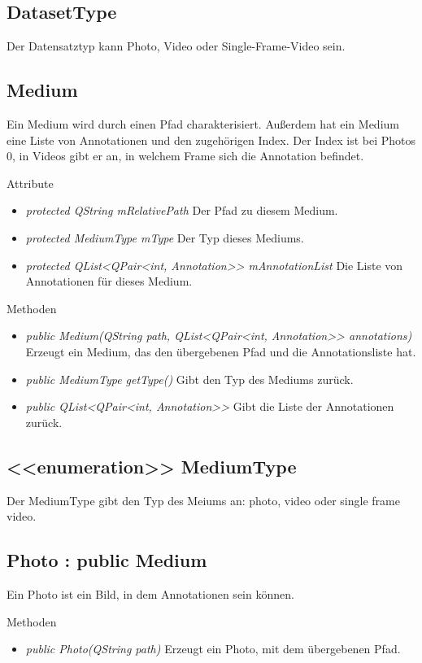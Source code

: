\subsection*{DatasetType}
Der Datensatztyp kann Photo, Video oder Single-Frame-Video sein.

\subsection*{Medium}
Ein Medium wird durch einen Pfad charakterisiert. Außerdem hat ein Medium eine Liste von Annotationen und den zugehörigen Index. Der Index ist bei Photos 0, in Videos gibt er an, in welchem Frame sich die Annotation befindet.

Attribute
\begin{itemize}
\item\textit{protected QString mRelativePath} Der Pfad zu diesem Medium.
\item\textit{protected MediumType mType} Der Typ dieses Mediums.
\item\textit{protected QList<QPair<int, Annotation>> mAnnotationList} Die Liste von Annotationen für dieses Medium.
\end{itemize}

Methoden
\begin{itemize}
\item \textit{public Medium(QString path, QList<QPair<int, Annotation>> annotations)} Erzeugt ein Medium, das den übergebenen Pfad und die Annotationsliste hat.
\item \textit{public MediumType getType()} Gibt den Typ des Mediums zurück.
\item \textit{public QList<QPair<int, Annotation>>} Gibt die Liste der Annotationen zurück.
\end{itemize}

\subsection*{<<enumeration>> MediumType}
Der MediumType gibt den Typ des Meiums an: photo, video oder single frame video.

\subsection*{Photo : public Medium}
Ein Photo ist ein Bild, in dem Annotationen sein können.

Methoden
\begin{itemize}
\item \textit{public Photo(QString path)} Erzeugt ein Photo, mit dem übergebenen Pfad.
\end{itemize}

